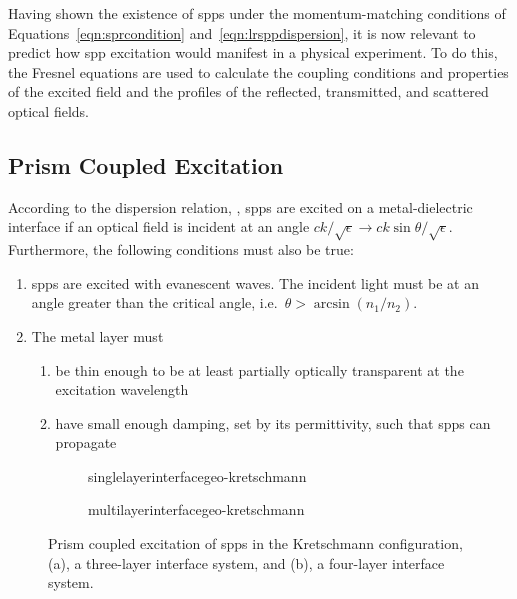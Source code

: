 Having shown the existence of \glspl{spp} under the momentum-matching conditions
of Equations~\ref{eqn:sprcondition} and~\ref{eqn:lrsppdispersion}, it is
now relevant to predict how \gls{spp} excitation would manifest in a physical
experiment.  To do this, the Fresnel equations are used to calculate the
coupling conditions and properties of the excited field and the profiles of
the reflected, transmitted, and scattered optical fields.

\subsection{Prism Coupled Excitation}
According to the dispersion relation, , \glspl{spp} are
excited on a metal-dielectric interface if an optical field is incident at
an angle $ck/\sqrt{\epsilon} \to ck\sin\theta/\sqrt{\epsilon}$.
Furthermore, the following conditions must also be true:
\begin{enumerate}
	\item \glspl{spp} are excited with evanescent waves.  The
	      incident light must be at an angle greater than the critical angle, i.e.\
	      $\theta>\arcsin\left(n_1/n_2\right)$.
	\item The metal layer must
	      \begin{enumerate}
		      \item be thin enough to be at least partially optically transparent at the excitation wavelength
		      \item have small enough damping, set by its permittivity, such that \glspl{spp} can propagate
	      \end{enumerate}
\end{enumerate}

\begin{figure}[ht]
	\centering
	\begin{subfigure}[b]{0.4\textwidth}
		\centering
		{singlelayerinterfacegeo-kretschmann}
		\caption{}
	\end{subfigure}
	\begin{subfigure}[b]{0.4\textwidth}
		{multilayerinterfacegeo-kretschmann}
		\caption{}
	\end{subfigure}
	\caption{Prism coupled excitation of \glspl{spp} in the Kretschmann configuration,
		(a), a three-layer interface system, and (b), a four-layer interface system. }
	\label{fig:prismcoupledsetups}
\end{figure}

